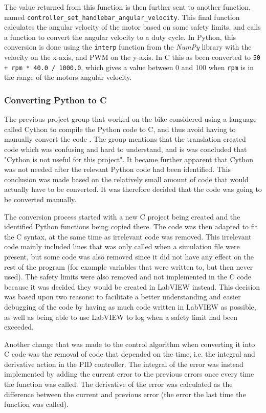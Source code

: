 The value returned from this function is then further sent to another function, named \texttt{controller\_set\_handlebar\_angular\_velocity}. This final function calculates the angular velocity of the motor based on some safety limits, and calls a function to convert the angular velocity to a duty cycle. In Python, this conversion is done using the \texttt{interp} function from the \textit{NumPy} library with the velocity on the x-axis, and PWM on the y-axis. In C this as been converted to \texttt{50 + rpm * 40.0 / 1000.0}, which gives a value between 0 and 100 when \texttt{rpm} is in the range of the motors angular velocity.

\subsubsection{Converting Python to C}

The previous project group that worked on the bike considered using a language called Cython to compile the Python code to C, and thus avoid having to manually convert the code \cite{AronssonKarlsson2022PROJECTAUTOBIKE}. The group mentions that the translation created code which was confusing and hard to understand, and is was concluded that "Cython is not useful for this project". It became further apparent that Cython was not needed after the relevant Python code had been identified. This conclusion was made based on the relatively small amount of code that would actually have to be converted. It was therefore decided that the code was going to be converted manually.

The conversion process started with a new C project being created and the identified Python functions being copied there. The code was then adapted to fit the C syntax, at the same time as irrelevant code was removed. This irrelevant code mainly included lines that was only called when a simulation file were present, but some code was also removed since it did not have any effect on the rest of the program (for example variables that were written to, but then never used). The safety limits were also removed and not implemented in the C code because it was decided they would be created in LabVIEW instead. This decision was based upon two reasons: to facilitate a better understanding and easier debugging of the code by having as much code written in LabVIEW as possible, as well as being able to use LabVIEW to log when a safety limit had been exceeded.

Another change that was made to the control algorithm when converting it into C code was the removal of code that depended on the time, i.e. the integral and derivative action in the PID controller. The integral of the error was instead implemented by adding the current error to the previous errors once every time the function was called. The derivative of the error was calculated as the difference between the current and previous error (the error the last time the function was called).


